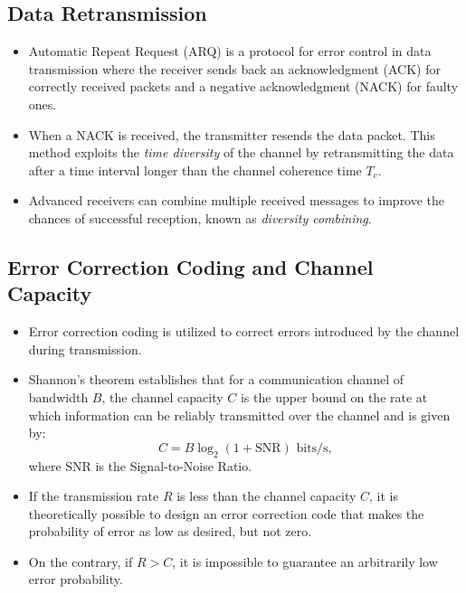 \subsection*{Data Retransmission}
\begin{itemize}
    \item Automatic Repeat Request (ARQ) is a protocol for error control in data transmission where the receiver sends back an acknowledgment (ACK) for correctly received packets and a negative acknowledgment (NACK) for faulty ones.
    \item When a NACK is received, the transmitter resends the data packet. This method exploits the \textit{time diversity} of the channel by retransmitting the data after a time interval longer than the channel coherence time \( T_c \).
    \item Advanced receivers can combine multiple received messages to improve the chances of successful reception, known as \textit{diversity combining}.
\end{itemize}

\subsection*{Error Correction Coding and Channel Capacity}
\begin{itemize}
    \item Error correction coding is utilized to correct errors introduced by the channel during transmission.
    \item Shannon's theorem establishes that for a communication channel of bandwidth \( B \), the channel capacity \( C \) is the upper bound on the rate at which information can be reliably transmitted over the channel and is given by:
    \[ C = B \log_2 (1 + \text{SNR}) \text{ bits/s}, \]
    where SNR is the Signal-to-Noise Ratio.
    \item If the transmission rate \( R \) is less than the channel capacity \( C \), it is theoretically possible to design an error correction code that makes the probability of error as low as desired, but not zero.
    \item On the contrary, if \( R > C \), it is impossible to guarantee an arbitrarily low error probability.
\end{itemize}

